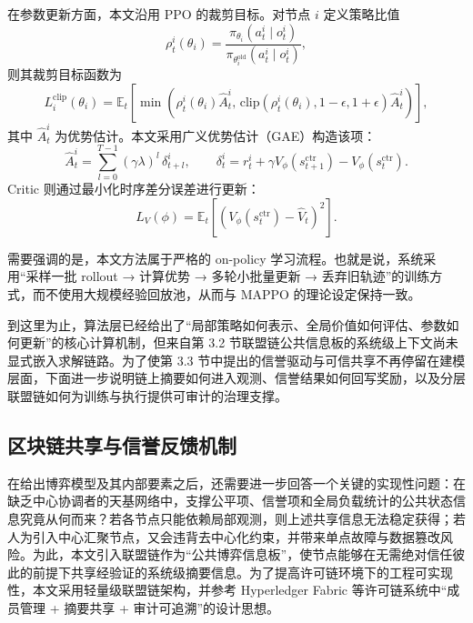 \documentclass[UTF8,12pt,oneside]{ctexbook}
\begin{document}
在参数更新方面，本文沿用 PPO 的裁剪目标\cite{ref4,ref5,ref9}。对节点 $i$ 定义策略比值
\begin{equation}
  \rho_t^i(\theta_i)=\frac{\pi_{\theta_i}(a_t^i\mid o_t^i)}{\pi_{\theta_i^{\mathrm{old}}}(a_t^i\mid o_t^i)},
  \label{eq:ratio}
\end{equation}
则其裁剪目标函数为
\begin{equation}
  L_i^{\mathrm{clip}}(\theta_i)=\mathbb{E}_t\!\left[\min\!\left(\rho_t^i(\theta_i)\hat{A}_t^i,\,
  \mathrm{clip}(\rho_t^i(\theta_i),1-\epsilon,1+\epsilon)\hat{A}_t^i\right)\right],
  \label{eq:ppo_clip}
\end{equation}
其中 $\hat{A}_t^i$ 为优势估计。本文采用广义优势估计（GAE）构造该项：
\begin{equation}
  \hat{A}_t^i=\sum_{l=0}^{T-1}(\gamma\lambda)^l\,\delta_{t+l}^i,\qquad
  \delta_t^i=r_t^i+\gamma V_\phi\!\left(s_{t+1}^{\mathrm{ctr}}\right)-V_\phi\!\left(s_t^{\mathrm{ctr}}\right).
  \label{eq:gae}
\end{equation}
Critic 则通过最小化时序差分误差进行更新：
\begin{equation}
  L_V(\phi)=\mathbb{E}_t\!\left[\left(V_\phi\!\left(s_t^{\mathrm{ctr}}\right)-\hat{V}_t\right)^2\right].
  \label{eq:value_loss}
\end{equation}

需要强调的是，本文方法属于严格的 on-policy 学习流程。也就是说，系统采用“采样一批 rollout → 计算优势 → 多轮小批量更新 → 丢弃旧轨迹”的训练方式，而不使用大规模经验回放池，从而与 MAPPO 的理论设定保持一致。

到这里为止，算法层已经给出了“局部策略如何表示、全局价值如何评估、参数如何更新”的核心计算机制，但来自第 3.2 节联盟链公共信息板的系统级上下文尚未显式嵌入求解链路。为了使第 3.3 节中提出的信誉驱动与可信共享不再停留在建模层面，下面进一步说明链上摘要如何进入观测、信誉结果如何回写奖励，以及分层联盟链如何为训练与执行提供可审计的治理支撑。

\subsection{区块链共享与信誉反馈机制}

在给出博弈模型及其内部要素之后，还需要进一步回答一个关键的实现性问题：在缺乏中心协调者的天基网络中，支撑公平项、信誉项和全局负载统计的公共状态信息究竟从何而来？若各节点只能依赖局部观测，则上述共享信息无法稳定获得；若人为引入中心汇聚节点，又会违背去中心化约束，并带来单点故障与数据篡改风险。为此，本文引入联盟链作为“公共博弈信息板”，使节点能够在无需绝对信任彼此的前提下共享经验证的系统级摘要信息。为了提高许可链环境下的工程可实现性，本文采用轻量级联盟链架构，并参考 Hyperledger Fabric 等许可链系统中“成员管理 + 摘要共享 + 审计可追溯”的设计思想\cite{ref8}。
\end{document}
